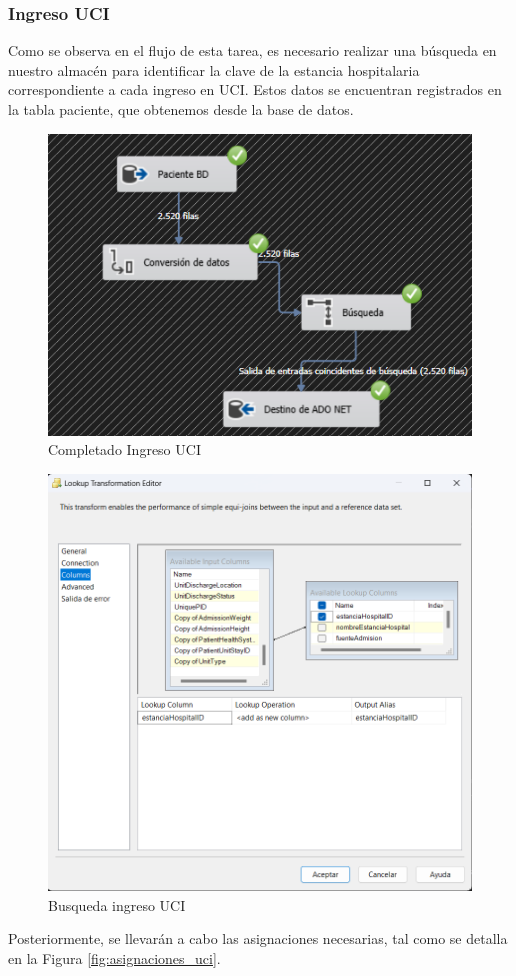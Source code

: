 \documentclass{article}
\begin{document}
	\subsubsection{Ingreso UCI}
	Como se observa en el flujo de esta tarea, es necesario realizar una búsqueda en nuestro almacén para identificar la clave de la estancia hospitalaria correspondiente a cada ingreso en UCI. Estos datos se encuentran registrados en la tabla paciente, que obtenemos desde la base de datos. 
		\begin{figure}[H]
		\centering
		\includegraphics[width=.5\linewidth]{./images/completados/ingreso_uci.png}
		\caption{Completado Ingreso UCI}
	\end{figure}
	\begin{figure}[H]
		\centering
		\includegraphics[width=.7\linewidth]{./images/busquedas/ingreso_uci.png}
		\caption{Busqueda ingreso UCI}
	\end{figure}
	Posteriormente, se llevarán a cabo las asignaciones necesarias, tal como se detalla en la Figura \ref{fig:asignaciones_uci}.
\end{document}
